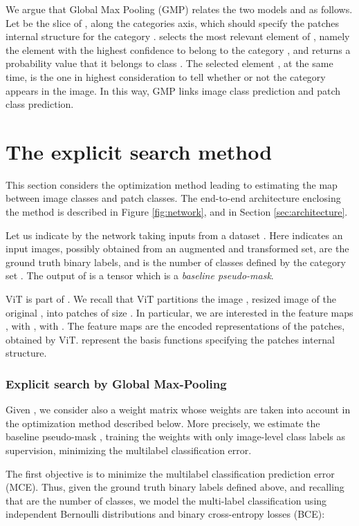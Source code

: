 \documentclass[runningheads]{styles/llncs}
\begin{document}
We argue that  Global Max Pooling (GMP) relates the two models  and  as follows. 
Let  be the slice of , along the categories axis, which should specify the patches internal structure for the category .   selects the most relevant element of , namely the element with the highest confidence to belong to the category , and returns a probability value  that it  belongs to class .
The selected element ,  at the same time, is the one in highest consideration to tell whether or not the category  appears in the image. In this way, GMP links image class prediction and patch class prediction. 

\section{The explicit search method}\label{sec:explicit_search}


This section considers the optimization method leading to estimating the map between image classes and patch classes. The  end-to-end architecture enclosing the method is described in Figure \ref{fig:network}, and in Section \ref{sec:architecture}. 

Let us indicate by  the network taking inputs from a dataset .  Here  indicates an input images, possibly obtained from an augmented and transformed set,   are the ground truth binary labels, and  is the number of classes defined by the category set . The output of  is a tensor  which is a {\em baseline pseudo-mask}.

ViT is part of . We recall that ViT partitions the image , resized image of the original  ,  into  patches of size . In particular, we are interested in the feature maps , with , with .  The feature maps   are the encoded representations of the patches, obtained by ViT.   represent the basis functions specifying the patches internal structure.  


\subsubsection{Explicit search by Global Max-Pooling}
Given , we consider also a weight matrix   whose weights are taken into account in the  optimization method described below. More precisely, we estimate the baseline pseudo-mask , training the weights   with only image-level class labels as supervision,  minimizing the multilabel classification error. 

The first objective  is to minimize the multilabel classification prediction error (MCE). Thus, given the ground truth binary labels  defined above, and recalling that  are the number of classes,  we model the multi-label classification using  independent Bernoulli distributions and  binary cross-entropy losses (BCE):
\end{document}
